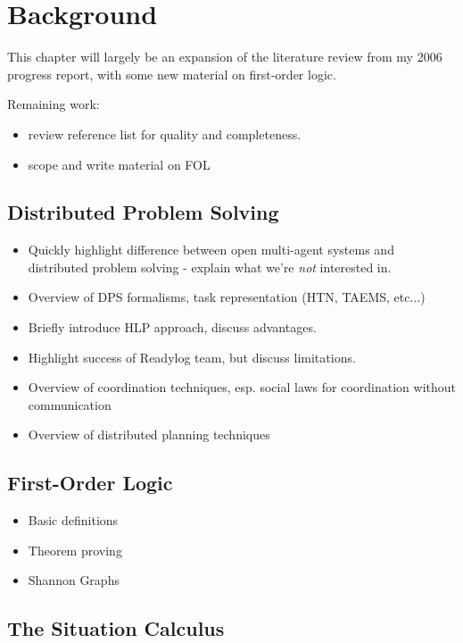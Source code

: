 \chapter{Background}\label{ch:lit-review}

This chapter will largely be an expansion of the literature review from my 2006 progress report, with some new material on first-order logic.

Remaining work: 
\begin{itemize}
 \item review reference list for quality and completeness.
 \item scope and write material on FOL
\end{itemize}

\section{Distributed Problem Solving}

\begin{itemize}
\item Quickly highlight difference between open multi-agent systems and
distributed problem solving - explain what we're \emph{not} interested in.
\item Overview of DPS formalisms, task representation (HTN, TAEMS, etc...)
\item Briefly introduce HLP approach, discuss advantages.
\item Highlight success of Readylog team, but discuss limitations.
\item Overview of coordination techniques, esp. social laws for coordination without communication
\item Overview of distributed planning techniques
\end{itemize}

\section{First-Order Logic}

\begin{itemize}
\item Basic definitions
\item Theorem proving
\item Shannon Graphs
\end{itemize}

\section{The Situation Calculus}

